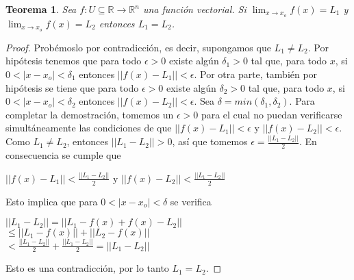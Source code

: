 \documentclass{book}
\newtheorem{theorem}{Teorema}[section]
\begin{document}
\begin{theorem}
Sea $f:U \subseteq \mathbb{R} \rightarrow \mathbb{R}^n$ una función vectorial. Si $\displaystyle \lim_{x \to x_o}f(x)=L_1$ y $\displaystyle \lim_{x \to x_o}f(x)=L_2$ entonces $L_1=L_2$. 
\end{theorem}
\begin{proof}
 Probémoslo por contradicción, es decir, supongamos que $L_1 \neq L_2$. Por hipótesis tenemos que para todo $\epsilon > 0$ existe algún $\delta_1 > 0$ tal que, para todo $x$, si $0 < |x-x_o| < \delta_1$ entonces $||f(x)-L_1|| < \epsilon$. Por otra parte, también por hipótesis se tiene que para todo $\epsilon > 0$ existe algún $\delta_2 > 0$ tal que, para todo $x$, si $0 < |x-x_o| < \delta_2$ entonces $||f(x)-L_2|| < \epsilon$. Sea $\delta=min(\delta_1, \delta_2)$. Para completar la demostración, tomemos un $\epsilon > 0$ para el cual no puedan verificarse simultáneamente las condiciones de que $||f(x)-L_1|| < \epsilon$ y $||f(x)-L_2|| < \epsilon$. Como $L_1 \neq L_2$, entonces $||L_1-L_2|| > 0$, así que tomemos $\epsilon=\frac{||L_1-L_2||}{2}$. En consecuencia se cumple que 
 
 \begin{center}
       $||f(x)-L_1||<\frac{||L_1-L_2||}{2}$ y $||f(x)-L_2||<\frac{||L_1-L_2||}{2}$
\end{center}

Esto implica que para $0<|x-x_o|<\delta$ se verifica

\begin{center}
       $||L_1-L_2||=||L_1-f(x)+f(x)-L_2||$
        \\[1\baselineskip]
       $\leq||L_1-f(x)||+||L_2-f(x)||$
        \\[1\baselineskip]
       $<\frac{||L_1-L_2||}{2}+\frac{||L_1-L_2||}{2}=||L_1-L_2||$
\end{center}

Esto es una contradicción, por lo tanto $L_1=L_2$.
\end{proof}
\end{document}
